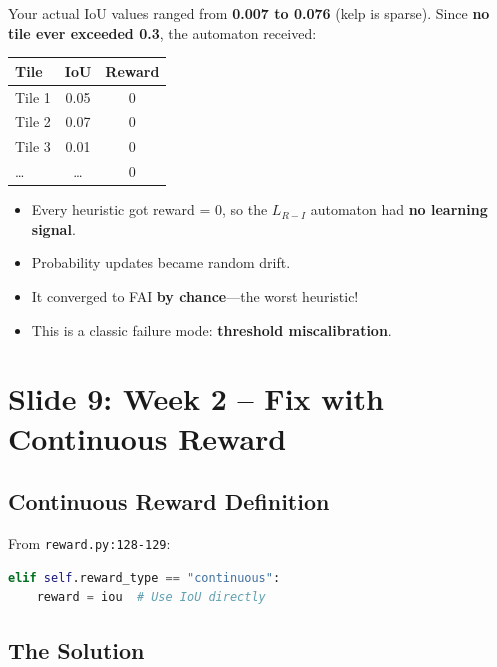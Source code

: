 \documentclass[11pt]{article}
\newenvironment{talkingpoints}{%
  \begin{itemize}[leftmargin=1.5em, itemsep=0.3em]
}{%
  \end{itemize}
}
\begin{document}
Your actual IoU values ranged from \textbf{0.007 to 0.076} (kelp is sparse). Since \textbf{no tile ever exceeded 0.3}, the automaton received:

\begin{center}
\begin{tabular}{lcc}
\toprule
\textbf{Tile} & \textbf{IoU} & \textbf{Reward} \\
\midrule
Tile 1 & 0.05 & 0 \\
Tile 2 & 0.07 & 0 \\
Tile 3 & 0.01 & 0 \\
\ldots & \ldots & 0 \\
\bottomrule
\end{tabular}
\end{center}

\begin{talkingpoints}
  \item Every heuristic got reward = 0, so the $L_{R-I}$ automaton had \textbf{no learning signal}.
  \item Probability updates became random drift.
  \item It converged to FAI \textbf{by chance}---the worst heuristic!
  \item This is a classic failure mode: \textbf{threshold miscalibration}.
\end{talkingpoints}

\section{Slide 9: Week 2 -- Fix with Continuous Reward}

\subsection{Continuous Reward Definition}

From \texttt{reward.py:128-129}:

\begin{lstlisting}[language=Python]
elif self.reward_type == "continuous":
    reward = iou  # Use IoU directly
\end{lstlisting}

\subsection{The Solution}
\end{document}

